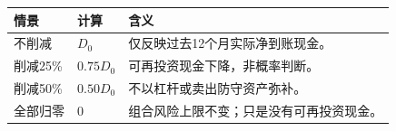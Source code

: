 \begin{exhibitbox}[已实现现金的审慎重算]
\small
\begin{tabularx}{\exhibitboxwidth}{L{3cm}P P}
\toprule
\textbf{情景} & \textbf{计算} & \textbf{含义} \\
\midrule
不削减 & $D_0$ & 仅反映过去12个月实际净到账现金。 \\
削减25\% & $0.75D_0$ & 可再投资现金下降，非概率判断。 \\
削减50\% & $0.50D_0$ & 不以杠杆或卖出防守资产弥补。 \\
全部归零 & $0$ & 组合风险上限不变；只是没有可再投资现金。 \\
\bottomrule
\end{tabularx}
\end{exhibitbox}

